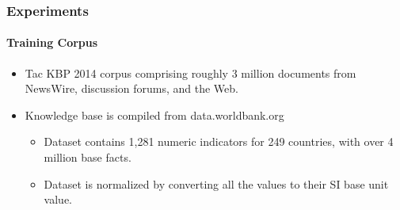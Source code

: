 \documentclass{beamer}
\begin{document}
\begin{frame}
\frametitle{Experiments}
\framesubtitle{Training Corpus}

\begin{itemize}
\item Tac KBP 2014 corpus comprising roughly 3 million documents from NewsWire, discussion forums, and the Web.
\item Knowledge base is compiled from data.worldbank.org
\begin{itemize}
\item Dataset contains 1,281 numeric indicators for 249 countries, with over 4 million base facts.
\item Dataset is normalized by converting all the values to their SI base unit value.
\end{itemize}
\end{itemize}

\end{frame}

\end{document}
